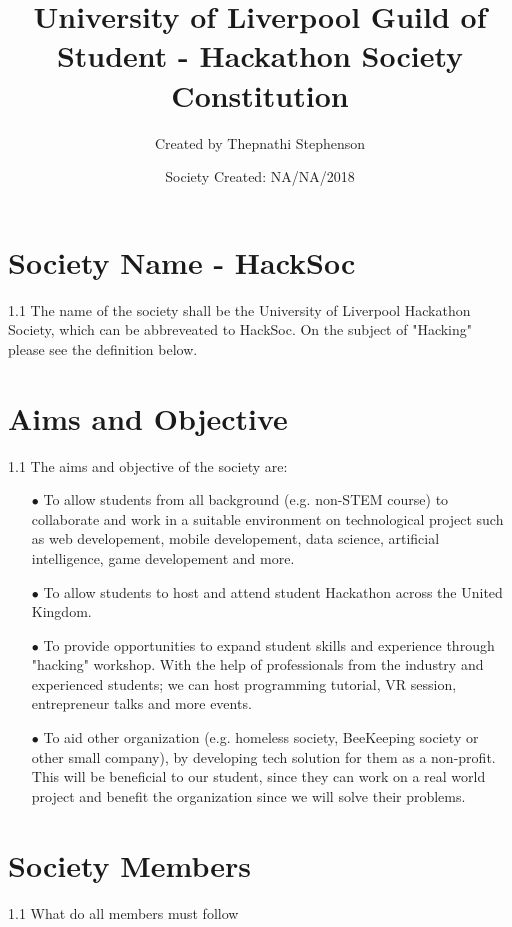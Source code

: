 \documentclass{report}
\title{University of Liverpool Guild of Student - Hackathon Society Constitution}
\author{Created by Thepnathi Stephenson}
\date{Society Created: NA/NA/2018}
\begin{document}
  
  \maketitle
  
  \section{Society Name - HackSoc}
  1.1 The name of the society shall be the University of Liverpool Hackathon Society, 
  which can be abbreveated to HackSoc. 
  On the subject of "Hacking" please see the definition below.
  
  \section{Aims and Objective}
  1.1 The aims and objective of the society are:
  \begin{itemize}
    \item[$\bullet$]To allow students from all background (e.g. non-STEM course)
     to collaborate and work in a suitable environment on technological project such as web developement,
      mobile developement, data science, artificial intelligence, game developement and more.
    
    \item[$\bullet$] To allow students to host and attend student Hackathon across the United Kingdom.
    
    \item[$\bullet$] To provide opportunities to expand student skills and experience through
     "hacking" workshop. With the help of professionals from the industry and experienced students;
      we can host programming tutorial, VR session, entrepreneur talks and more events.
     
    \item[$\bullet$] To aid other organization (e.g. homeless society, BeeKeeping society or other small company),
     by developing tech solution for them as a non-profit. This will be beneficial to our student, since they can work on a real world project and benefit the organization since we will solve their problems.
  \end{itemize}
  
  
  \section{Society Members}
  1.1 What do all members must follow
  
\end{document}
